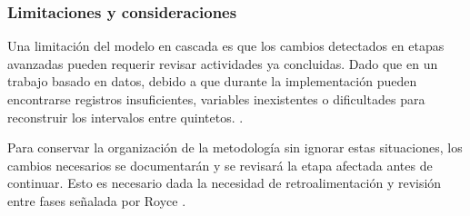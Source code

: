 \subsubsection{Limitaciones y consideraciones}

Una limitación del modelo en cascada es que los cambios detectados en etapas avanzadas pueden requerir revisar actividades ya concluidas. Dado que en un trabajo basado en datos, debido a que durante la implementación pueden encontrarse registros insuficientes, variables inexistentes o dificultades para reconstruir los intervalos entre quintetos. \cite{sommerville2016software,ibmWaterfallAdvantages}.

Para conservar la organización de la metodología sin ignorar estas situaciones, los cambios necesarios se documentarán y se revisará la etapa afectada antes de continuar. Esto es necesario dada la necesidad de retroalimentación y revisión entre fases señalada por Royce \cite{royce1970large}.